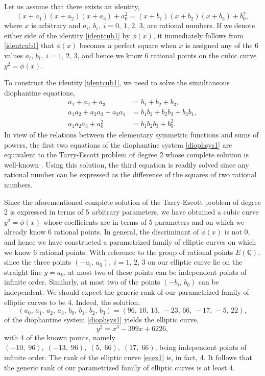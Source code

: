 \documentclass[11pt, leqno]{article}
\begin{document}
Let us assume that there exists an identity,
\begin{equation}
(x+a_1)(x+a_2)(x+a_3)+a_0^2=(x+b_1)(x+b_2)(x+b_3)+b_0^2, \label{identcub1}
\end{equation}
where $x$ is arbitrary and $a_i,\,b_i,\;i=0,\,1,\,2,\,3$, are rational numbers. If we denote either 
side of the identity \eqref{identcub1} by $\phi(x)$, it immediately follows from \eqref{identcub1} that $\phi(x)$ becomes a perfect square when $x$ is assigned any of the 6 values $a_i,\,b_i,\;i=1,\,2,\,3$, and hence we know  6 rational points on the cubic curve $y^2=\phi(x)$.  

To construct the identity \eqref{identcub1}, we need to solve the simultaneous diophantine equations,
\begin{equation}
\begin{aligned}
a_1+a_2+a_3&= b_1+b_2+b_3,\\
a_1a_2+a_2a_3+a_3a_1&=b_1b_2+b_2b_3+b_3b_1,\\
a_1a_2a_3+a_0^2&=b_1b_2b_3+b_0^2.
\end{aligned} \label{diophsys1}
\end{equation}
In view of the relations between the elementary symmetric functions and sums of powers, the first two equations of the diophantine system \eqref{diophsys1} are equivalent to the Tarry-Escott problem of degree 2 whose complete solution is well-known \cite[p. 52]{Di}. Using this solution, the third equation is readily solved since any rational number can be expressed as the difference of the  squares of two rational numbers.

Since the aforementioned complete solution of the Tarry-Escott problem of degree 2 is expressed in  terms of 5 arbitrary parameters, we have  obtained a cubic curve $y^2=\phi(x)$ whose coefficients are  in terms of 5 parameters and on which we already know 6 rational points. In general, the discriminant of $\phi(x)$ is not 0, and hence we have constructed a parametrized family of  elliptic curves on which we know  6 rational points. With reference to the group of rational points $E(\mathbb{Q})$, since the three  points $(-a_i,\,a_0),\;i=1,\,2,\,3$ on our elliptic curve lie on the straight line $y=a_0$, at most  two of these points can be independent points of infinite order. Similarly, at most  two of the points $(-b_i,\,b_0)$ can be independent. We should  expect  the generic rank of our parametrized family of elliptic curves  to be 4.  Indeed, the solution, 
\[(a_0,\,a_1,\,a_2,\,a_3,\,b_0,\,b_1,\,b_2,\,b_3)=(96,\,10,\,13,\,  -23,\,66,\,-17,\, -5,\,  22),\]  
of the diophantine system \eqref{diophsys1} yields the elliptic curve, 
\begin{equation}
y^2=x^3-399x+6226, \label{ecex1}
\end{equation}
 with 4 of the known points, namely $(-10,\;96),\;(-13,\;96),\;(5,\;66),\;(17,\;66)$, being independent points of infinite order.   The rank of the elliptic curve \eqref{ecex1} is, in fact,  4. It follows that the generic rank of our parametrized family of elliptic curves is at least 4.
\end{document}
